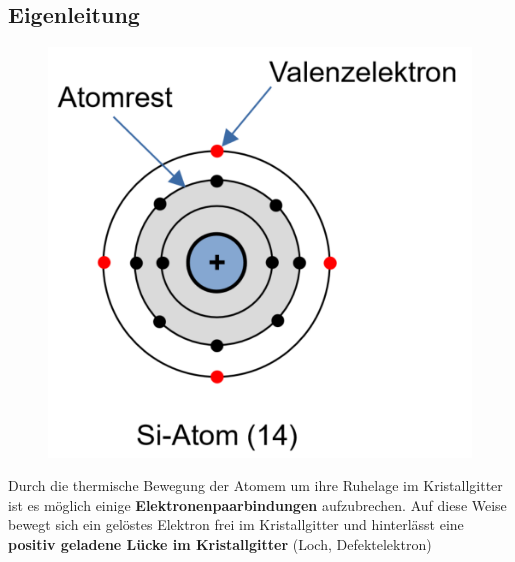 \subsection{Eigenleitung} 
\begin{minipage}{\linewidth}
        \begin{figure}
            \vspace{-1cm}
            \includegraphics[width=\linewidth]{images/Si-Atom14}  
        \end{figure}
    Durch die thermische Bewegung der Atomem um ihre Ruhelage im Kristallgitter ist es möglich einige \textbf{Elektronenpaarbindungen} aufzubrechen.\newline
    Auf diese Weise bewegt sich ein gelöstes Elektron frei im Kristallgitter und hinterlässt eine \textbf{positiv geladene Lücke im Kristallgitter} (Loch, Defektelektron)
\end{minipage}
\newline
\hspace{2cm}
